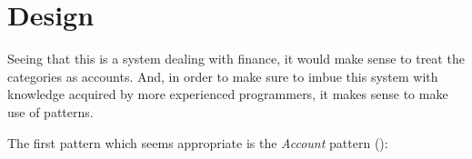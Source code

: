 \section{Design} \label{sec:Design}

Seeing that this is a system dealing with finance, it would make sense to treat
the categories as accounts. And, in order to make sure to imbue this system
with knowledge acquired by more experienced programmers, it makes sense to make
use of patterns.

The first pattern which seems appropriate is the \emph{Account} pattern
(\cite[][Section~6.1]{fowler1997analysis}):


